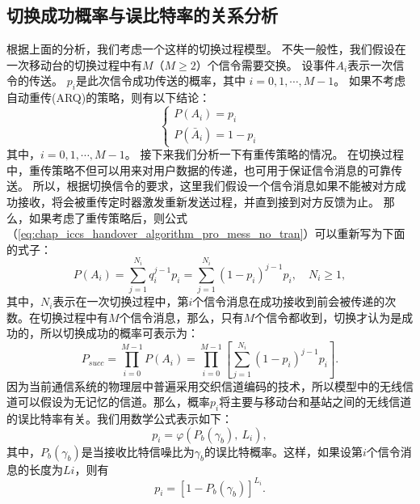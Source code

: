 \subsection{切换成功概率与误比特率的关系分析}
根据上面的分析，我们考虑一个这样的切换过程模型。
不失一般性，我们假设在一次移动台的切换过程中有$M$（$M \ge 2 $）个信令需要交换。
设事件$A_i$表示一次信令的传送。
 $p_i$是此次信令成功传送的概率，其中 $i = 0,1, \cdots, M-1 $。
如果不考虑自动重传(ARQ)的策略，则有以下结论：
\begin{equation}
\label{eq:chap_iccs_handover_algorithm_pro_mess_no_tran}
\begin{cases}
P(A_{i})=p_{i}\\
P(\bar{A}_{i})=1- p_{i}
\end{cases}
\end{equation}
其中，$i=0,1,\cdots,M-1$。
接下来我们分析一下有重传策略的情况。
在切换过程中，重传策略不但可以用来对用户数据的传递，也可用于保证信令消息的可靠传送。
所以，根据切换信令的要求，这里我们假设一个信令消息如果不能被对方成功接收，将会被重传定时器激发重新发送过程，并直到接到对方反馈为止。
那么，如果考虑了重传策略后，则公式 （\ref{eq:chap_iccs_handover_algorithm_pro_mess_no_tran}）可以重新写为下面的式子：
\begin{equation}
\label{eq:chap_iccs_handover_algorithm_Pro_basic01}
P(A_{i})=\sum_{j=1}^{N_{i}}q_{i}^{j-1}p_{i}=\sum_{j=1}^{N_{i}}
(1-p_{i})^{j-1}p_{i},\quad N_{i}\geq1,
\end{equation}
其中，$N_i$表示在一次切换过程中，第$i$个信令消息在成功接收到前会被传递的次数。在切换过程中有$M$个信令消息，那么，只有$M$个信令都收到，切换才认为是成功的，所以切换成功的概率可表示为：
\begin{equation}
\label{eq:chap_iccs_handover_algorithm_Pro_basic02}
P_{succ}=\prod_{i=0}^{M-1}P(A_{i})=\prod_{i=0}^{M-1}
\left[\sum_{j=1}^{N_{i}}(1-p_{i})^{j-1}p_{i}\right].
\end{equation}
因为当前通信系统的物理层中普遍采用交织信道编码的技术，所以模型中的无线信道可以假设为无记忆的信道。那么，概率$p_i$将主要与移动台和基站之间的无线信道的误比特率有关。我们用数学公式表示如下：
$$
p_{i}=\varphi(P_{b}(\gamma_{b}),\: L_{i}),
$$
其中，$P_b(\gamma_b)$是当接收比特信噪比为$\gamma_b$的误比特概率。这样，如果设第$i$个信令消息的长度为$Li$，则有
\begin{equation}\label{eq:chap_iccs_handover_algorithm_Pro_basic03}
p_{i}=[1-P_{b}(\gamma_{b})]^{L_{i}}.
\end{equation}
